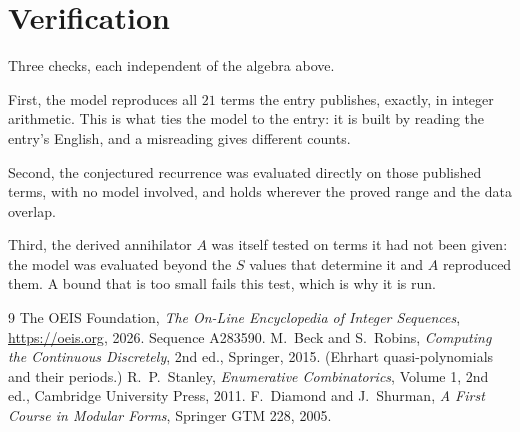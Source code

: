 \documentclass[11pt,a4paper]{article}
\theoremstyle{plain}
\theoremstyle{definition}
\begin{document}
\section{Verification}

Three checks, each independent of the algebra above.

First, the model reproduces all $21$ terms the entry publishes, exactly, in integer
arithmetic. This is what ties the model to the entry: it is built by reading the entry's
English, and a misreading gives different counts.

Second, the conjectured recurrence was evaluated directly on those published terms, with no
model involved, and holds wherever the proved range and the data overlap.

Third, the derived annihilator $A$ was itself tested on terms it had not been given: the model
was evaluated beyond the $S$ values that determine it and $A$ reproduced them. A bound that is
too small fails this test, which is why it is run.

\begin{thebibliography}{9}
 The OEIS Foundation, \emph{The On-Line Encyclopedia of Integer
Sequences}, \url{https://oeis.org}, 2026. Sequence A283590.
 M.~Beck and S.~Robins, \emph{Computing the Continuous Discretely},
2nd ed., Springer, 2015. (Ehrhart quasi-polynomials and their periods.)
 R.~P.~Stanley, \emph{Enumerative Combinatorics}, Volume 1, 2nd ed.,
Cambridge University Press, 2011.
 F.~Diamond and J.~Shurman, \emph{A First Course in Modular Forms},
Springer GTM 228, 2005.
\end{thebibliography}
\end{document}
